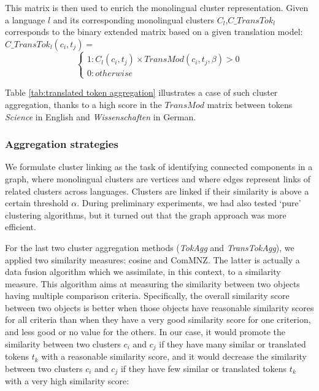 \documentclass[output=paper]{langsci/langscibook}
\begin{document}
This matrix is then used to enrich the monolingual cluster
representation.  Given a language $l$ and its corresponding
monolingual clusters $C_{l}$,$C\_TransTok_{l}$ corresponds to the
binary extended matrix based on a given translation model:\\

$C\_TransTok_{l}(c_i,t_j) =$
\[\left\{
  \begin{array}{lr}
    1 : C_{l}(c_i,t_j) \times TransMod(c_i,t_j,\beta) > 0\\
    0 : otherwise
  \end{array}
\right.
\]

Table \ref{tab:translated token aggregation} illustrates a case of
such cluster aggregation, thanks to a high score in the $TransMod$
matrix between tokens \textit{Science} in English and
\textit{Wissenschaften} in German.

\subsubsection{Aggregation strategies}
\label{aggregation clusters}

 
We formulate cluster linking as the task of identifying connected
components in a graph, where monolingual clusters are vertices and
where edges represent links of related clusters across
languages. Clusters are linked if their similarity is above a certain
threshold $\alpha$. During preliminary experiments, we had also tested
`pure' clustering algorithms, but it turned out that the graph
approach was more efficient.

For the last two cluster aggregation methods (\textit{TokAgg} and
\textit{TransTokAgg}), we applied two similarity measures: cosine and
ComMNZ. The latter is actually a data fusion algorithm \citep{fox-94}
which we assimilate, in this context, to a similarity measure.  This
algorithm aims at measuring the similarity between two objects having
multiple comparison criteria. Specifically, the overall similarity
score between two objects is better when those objects have reasonable
similarity scores for all criteria than when they have a very good
similarity score for one criterion, and less good or no value for the
others.  In our case, it would promote the similarity between two
clusters $c_i$ and $c_j$ if they have many similar or translated
tokens $t_k$ with a reasonable similarity score, and it would decrease
the similarity between two clusters $c_i$ and $c_j$ if they have few
similar or translated tokens $t_k$ with a very high similarity score:
\end{document}
